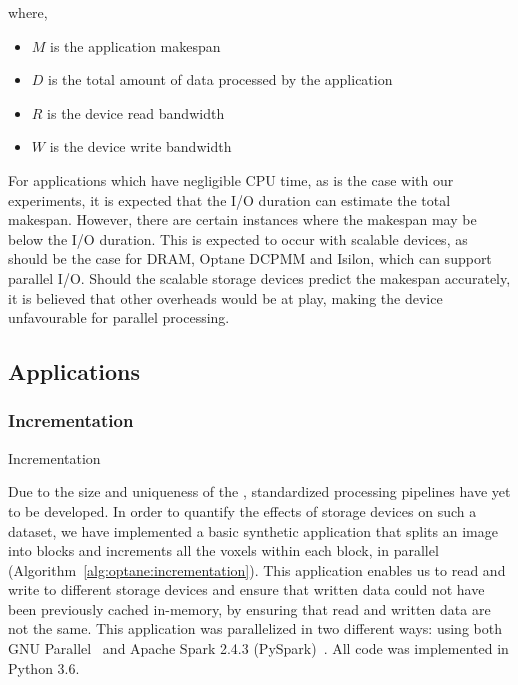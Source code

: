 where,
\begin{itemize}
        \item $M$ is the application makespan
        \item $D$ is the total amount of data processed by the application
        \item $R$ is the device read bandwidth
        \item $W$ is the device write bandwidth
\end{itemize}

For applications which have negligible CPU time, as is the case with our
experiments, it is expected that the I/O duration can estimate the total
makespan. However, there are certain instances where the makespan may be below
the I/O duration. This is expected to occur with scalable devices, as should be
the case for DRAM, Optane DCPMM and Isilon, which can support parallel I/O.
Should the scalable storage devices predict the makespan accurately, it is
believed that other overheads would be at play, making the device unfavourable
for parallel processing.

\subsection{Applications}
\subsubsection{ \bigbrain Incrementation}

\begin{algorithm2e}\caption{Incrementation}\label{alg:optane:incrementation}
     
\end{algorithm2e}  

Due to the size and uniqueness of the \bigbrain, standardized processing
pipelines have yet to be developed. In order to quantify the effects of storage
devices on such a dataset, we have implemented a basic synthetic application
that splits an image into blocks and increments all the voxels within each
block, in parallel (Algorithm~\ref{alg:optane:incrementation}). This application
enables us to read and write to different storage devices and ensure that
written data could not have been previously cached in-memory, by ensuring that
read and written data are not the same. This application was parallelized in two
different ways: using both GNU Parallel~\cite{gnuparallel} and Apache Spark
2.4.3 (PySpark)~\cite{zaharia2016apache}. All code was implemented in Python
3.6.


